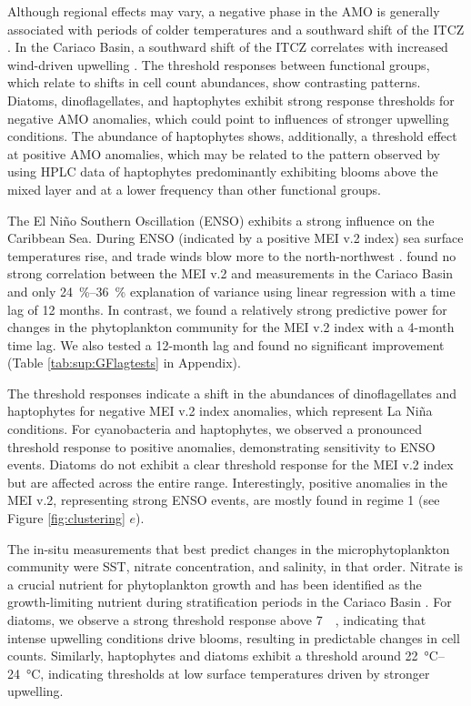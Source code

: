 \documentclass[draft]{agujournal2019}
\begin{document}
Although regional effects may vary, a negative phase in the AMO is generally associated with periods of colder temperatures and a southward shift of the ITCZ \cite{knight_climate_2006, colna2017latitudinal}. In the Cariaco Basin, a southward shift of the ITCZ correlates with increased wind-driven upwelling \cite{taylor_ecosystem_2012}. The threshold responses between functional groups, which relate to shifts in cell count abundances, show contrasting patterns. Diatoms, dinoflagellates, and haptophytes exhibit strong response thresholds for negative AMO anomalies, which could point to influences of stronger upwelling conditions. The abundance of haptophytes shows, additionally, a threshold effect at positive AMO anomalies, which may be related to the pattern observed by \citeauthor{pinckney_phytoplankton_2015} using HPLC data of haptophytes predominantly exhibiting blooms above the mixed layer and at a lower frequency than other functional groups. 


The El Niño Southern Oscillation (ENSO) exhibits a strong influence on the Caribbean Sea. During ENSO (indicated by a positive MEI v.2 index) sea surface temperatures rise, and trade winds blow more to the north-northwest \cite{enfield_tropical_1997}.  found no strong correlation between the MEI v.2 and measurements in the Cariaco Basin and only \qtyrange{24}{36}{\%} explanation of variance using linear regression with a time lag of 12 months. In contrast, we found a relatively strong predictive power for changes in the phytoplankton community for the MEI v.2 index with a 4-month time lag. We also tested a 12-month lag and found no significant improvement (Table \ref{tab:sup:GFlagtests} in Appendix).

The threshold responses indicate a shift in the abundances of dinoflagellates and haptophytes for negative MEI v.2 index anomalies, which represent La Niña conditions. For cyanobacteria and haptophytes, we observed a pronounced threshold response to positive anomalies, demonstrating sensitivity to ENSO events. Diatoms do not exhibit a clear threshold response for the MEI v.2 index but are affected across the entire range. Interestingly, positive anomalies in the MEI v.2, representing strong ENSO events, are mostly found in regime 1 (see Figure \ref{fig:clustering} $e$). 

The in-situ measurements that best predict changes in the microphytoplankton community were SST, nitrate concentration, and salinity, in that order. Nitrate is a crucial nutrient for phytoplankton growth and has been identified as the growth-limiting nutrient during stratification periods in the Cariaco Basin \cite{muller-karger_scientific_2019}. For diatoms, we observe a strong threshold response above \qty{7}{\micro \molar}, indicating that intense upwelling conditions drive blooms, resulting in predictable changes in cell counts. Similarly, haptophytes and diatoms exhibit a threshold around \qtyrange{22}{24}{\celsius}, indicating thresholds at low surface temperatures driven by stronger upwelling.
\end{document}
